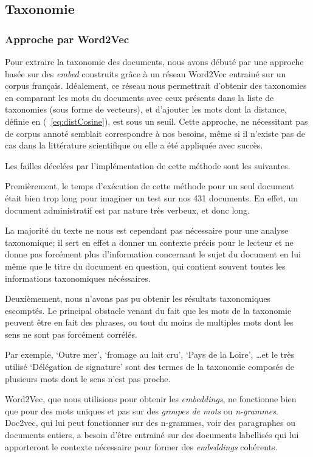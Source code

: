 \subsection{Taxonomie}%
\subsubsection{Approche par Word2Vec\label{word2vecReal}}
Pour extraire la taxonomie des documents, nous avons débuté par une approche basée sur des \textit{\gls{embed}} construits grâce à un réseau Word2Vec entrainé sur un corpus français.
Idéalement, ce réseau nous permettrait d'obtenir des taxonomies en comparant les mots du documents avec ceux présents dans la liste de taxonomies (sous forme de vecteurs), et d'ajouter les mots dont la distance, définie en (~\ref{eq:distCosine}), est sous un seuil.
Cette approche, ne nécessitant pas de corpus annoté semblait correspondre à nos besoins, même si il n'existe pas de cas dans la littérature scientifique ou elle a été appliquée avec succès. %


Les failles décelées par l'implémentation de cette méthode sont les suivantes.

Premièrement, le temps d'exécution de cette méthode pour un seul document était bien trop long pour imaginer un test sur nos 431 documents.
En effet, un document administratif est par nature très verbeux, et donc long.

La majorité du texte ne nous est cependant pas nécessaire pour une analyse taxonomique; 
il sert en effet a donner un contexte précis pour le lecteur et ne donne pas forcément plus d'information concernant le sujet du document en lui même que le titre du document en question, qui contient souvent toutes les informations taxonomiques nécéssaires. 


Deuxièmement, nous n'avons pas pu obtenir les résultats taxonomiques escomptés.
Le principal obstacle venant du fait que les mots de la taxonomie peuvent être en fait des phrases, ou tout du moins de multiples mots dont les sens ne sont pas forcément corrélés.

Par exemple, `Outre mer', `fromage au lait cru', `Pays de la Loire', \ldots et le très utilisé `Délégation de signature' sont des termes de la taxonomie composés de plusieurs mots dont le sens n'est pas proche.

Word2Vec, que nous utilisions pour obtenir les \textit{embeddings}, ne fonctionne bien que pour des mots uniques et pas sur des \textit{groupes de mots} ou \textit{n-grammes}.
Doc2vec, qui lui peut fonctionner sur des n-grammes, voir des paragraphes ou documents entiers, a besoin d'être entrainé sur des documents labellisés qui lui apporteront le contexte nécessaire pour former des \textit{embeddings} cohérents.


